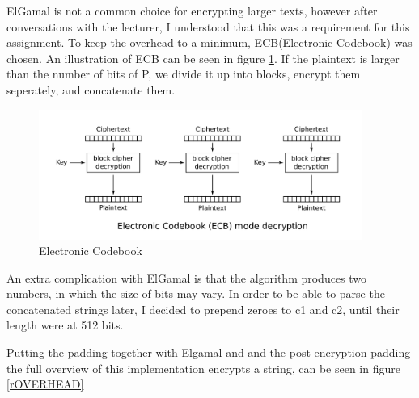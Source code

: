 \documentclass{article}
\begin{document}
ElGamal is not a common choice for encrypting larger texts, however after conversations with the lecturer, I understood that this was a requirement for this assignment. To keep the overhead to a minimum, ECB(Electronic Codebook) was chosen. An illustration of ECB can be seen in figure \ref{rECB}. If the plaintext is larger than the number of bits of P, we divide it up into blocks, encrypt them seperately, and concatenate them. 
\begin{figure}[H]
 \centering
  \includegraphics[width=300pt]{img/ECB.png}
 \caption{Electronic Codebook\cite{ECB}}
 \label{rECB}
 \end{figure}

An extra complication with ElGamal is that the algorithm produces two numbers, in which the size of bits may vary. In order to be able to parse the concatenated strings later, I decided to prepend zeroes to c1 and c2, until their length were at 512 bits.

Putting the padding together with Elgamal and and the post-encryption padding the full overview of this implementation encrypts a string, can be seen in figure \ref{rOVERHEAD}
\end{document}
